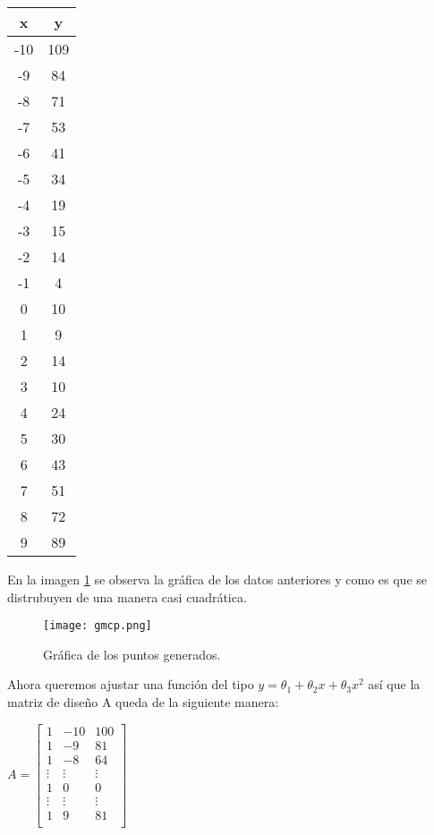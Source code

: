 \begin{center}
\begin{tabular}{|c|c| }
\hline
x & y \\
\hline
-10 & 109 \\
\hline
-9 & 84 \\
\hline
-8 & 71 \\ 
\hline  
-7 & 53 \\
\hline
-6 & 41 \\ 
\hline
-5 & 34 \\ 
\hline 
-4 & 19 \\ 
\hline 
-3 & 15 \\ 
\hline 
-2 & 14 \\
\hline   
-1 & 4 \\  
\hline 
0 & 10 \\ 
\hline   
1 & 9 \\
\hline
2 & 14 \\ 
\hline  
3 & 10 \\ 
\hline  
4 & 24 \\ 
\hline  
5 & 30 \\ 
\hline  
6 & 43 \\ 
\hline  
7 & 51 \\ 
\hline  
8 & 72 \\ 
\hline  
9 & 89 \\
\hline
\end{tabular}
\end{center}


En la imagen \ref{gpo} se observa la gráfica de los datos anteriores y como es que se distrubuyen de una manera casi cuadrática.

\begin{figure}

\centering
\texttt{[image: gmcp.png]}
\caption{Gráfica de los puntos generados.}\label{gpo}

\end{figure}

Ahora queremos ajustar una función del tipo $y = \theta_{1} + \theta_{2}x + \theta_{3}x^{2}$ así que la matriz de diseño A queda de la siguiente manera: 
	
\begin{center}
$ A = 
\begin{bmatrix}
1 & -10 & 100 \\
1 & -9 & 81 \\
1 & -8 & 64 \\
\vdots & \vdots & \vdots \\
1 & 0 & 0 \\
\vdots & \vdots & \vdots \\
1 & 9 & 81 \\
\end{bmatrix}
$
\end{center}

